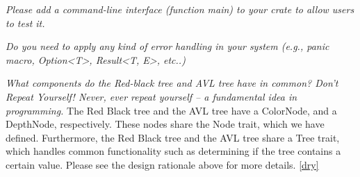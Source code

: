 \documentclass[letterpaper]{article}
\begin{document}
\textit{Please add a command-line interface (function main) to your crate to
allow users to test it.}

\textit{Do you need to apply any kind of error handling in your system (e.g., panic macro,
Option<T>, Result<T, E>, etc..)}

\textit{What components do the Red-black tree and AVL tree have in common? Don’t Repeat
Yourself! Never, ever repeat yourself – a fundamental idea in programming.}
The Red Black tree and the AVL tree have a ColorNode, and a DepthNode,
respectively. These nodes share the Node trait, which we have defined.
Furthermore, the Red Black tree and the AVL tree share a Tree trait, which
handles common functionality such as determining if the tree contains a certain
value.
Please see the design rationale above for more details. \ref{dry}
\end{document}
